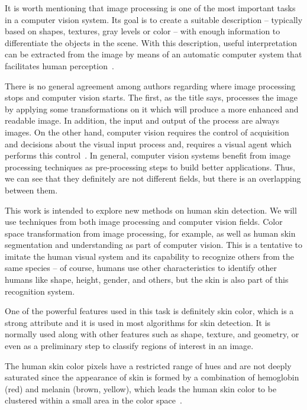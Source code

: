 It is worth mentioning that image processing is one of the most important tasks in a computer vision system. Its goal is to create a suitable description -- typically based on shapes, textures, gray levels or color -- with enough information to differentiate the objects in the scene. With this description, useful interpretation can be extracted from the image by means of an automatic computer system that facilitates human perception~\citep{gonzalez:02}.

There is no general agreement among authors regarding where image processing stops and computer vision starts. The first, as the title says, processes the image by applying some transformations on it which will produce a more enhanced and readable image. In addition, the input and output of the process are always images. On the other hand, computer vision requires the control of acquisition and decisions about the visual input process and, requires a visual agent which performs this control~\citep{gonzalez:02}. In general,
computer vision systems benefit from image processing techniques as pre-processing steps to build better applications. Thus, we can see that they definitely are not different fields, but there is an overlapping between them.

This work is intended to explore new methods on human skin detection. We will use techniques from both image processing and computer vision fields. Color space transformation from image processing, for example, as well as human skin segmentation and understanding as part of computer vision. This is a tentative to imitate the human visual system and its capability to recognize others from the same species -- of course, humans use other characteristics to identify other humans like shape, height, gender, and others, but the skin is also part of this recognition system.

One of the powerful features used in this task is definitely skin color, which is a strong attribute and it is used in most algorithms for skin detection. It is normally used along with other features such as shape, texture, and geometry, or even as a preliminary step to classify regions of interest in an image.

The human skin color pixels have a restricted range of hues and are not deeply saturated since the appearance of skin is formed by a combination of hemoglobin (red) and melanin (brown, yellow), which leads the human skin color to be clustered within a small area in the color space~\citep{fleck:96}.

